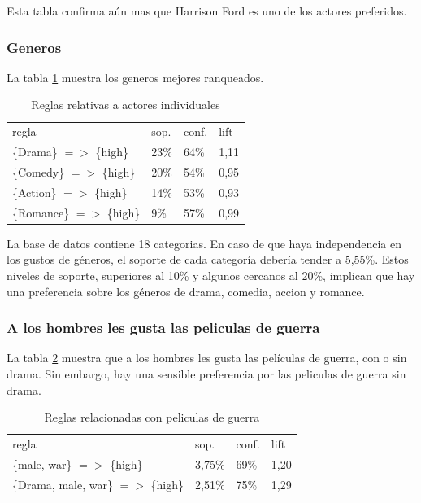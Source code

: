 \documentclass[journal]{IEEEtran}
\begin{document}
Esta tabla confirma aún mas que Harrison Ford es uno de los actores preferidos.

\subsubsection{Generos}
La tabla \ref{table_genre} muestra los generos mejores ranqueados.
\begin{table}[ht!]
\caption{Reglas relativas a actores individuales}
\label{table_genre}
\centering
\begin{tabular}{l l l l }
regla & sop. & conf. & lift \\
\{Drama\} $=$$>$ \{high\} & 23\% & 64\% & 1,11 \\
\{Comedy\} $=$$>$ \{high\} & 20\% & 54\% & 0,95 \\
\{Action\} $=$$>$ \{high\} & 14\% & 53\% & 0,93 \\
\{Romance\} $=$$>$ \{high\} & 9\% & 57\% & 0,99 \\
\end{tabular}
\end{table}

La base de datos contiene 18 categorias. En caso de que haya independencia en 
los gustos de géneros, el soporte de cada categoría debería tender a 5,55\%. 
Estos niveles de soporte, superiores al 10\% y algunos cercanos al 20\%,
implican que hay una preferencia sobre los géneros de drama, comedia,
accion y romance.

\subsubsection{A los hombres les gusta las peliculas de guerra}
La tabla \ref{table_male_ware} muestra que a los hombres
les gusta las películas de guerra, con o sin drama. Sin embargo,
hay una sensible preferencia por las peliculas de guerra sin
drama.

\begin{table}[ht!]
\caption{Reglas relacionadas con peliculas de guerra}
\label{table_male_ware}
\centering
\begin{tabular}{l l l l }
regla & sop. & conf. & lift \\
\{male, war\} $=$$>$ \{high\} & 3,75\% & 69\% & 1,20 \\
\{Drama, male, war\} $=$$>$ \{high\} & 2,51\% & 75\% & 1,29 \\
\end{tabular}
\end{table}
\end{document}
